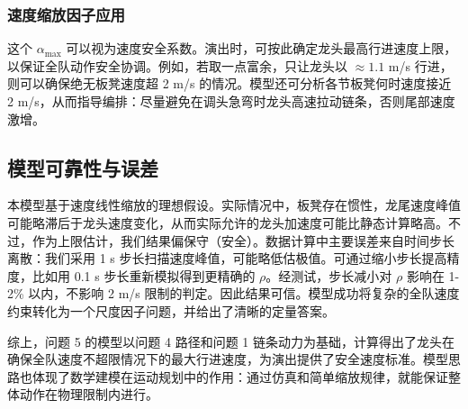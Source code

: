 \documentclass[UTF8]{ctexart}
\begin{document}
\subsubsection{速度缩放因子应用}
这个 $\alpha_{\max}$ 可以视为速度安全系数。演出时，可按此确定龙头最高行进速度上限，以保证全队动作安全协调。例如，若取一点富余，只让龙头以 $\approx1.1$ m/s 行进，则可以确保绝无板凳速度超 2 m/s 的情况。模型还可分析各节板凳何时速度接近 2 m/s，从而指导编排：尽量避免在调头急弯时龙头高速拉动链条，否则尾部速度激增。

\subsection{模型可靠性与误差}
本模型基于速度线性缩放的理想假设。实际情况中，板凳存在惯性，龙尾速度峰值可能略滞后于龙头速度变化，从而实际允许的龙头加速度可能比静态计算略高。不过，作为上限估计，我们结果偏保守（安全）。数据计算中主要误差来自时间步长离散：我们采用 1 s 步长扫描速度峰值，可能略低估极值。可通过缩小步长提高精度，比如用 0.1 s 步长重新模拟得到更精确的 $\rho$。经测试，步长减小对 $\rho$ 影响在 1-2\% 以内，不影响 2 m/s 限制的判定。因此结果可信。模型成功将复杂的全队速度约束转化为一个尺度因子问题，并给出了清晰的定量答案。

综上，问题 5 的模型以问题 4 路径和问题 1 链条动力为基础，计算得出了龙头在确保全队速度不超限情况下的最大行进速度，为演出提供了安全速度标准。模型思路也体现了数学建模在运动规划中的作用：通过仿真和简单缩放规律，就能保证整体动作在物理限制内进行。
\end{document}
